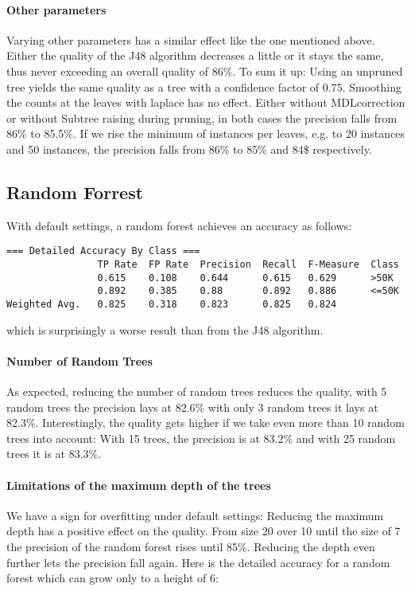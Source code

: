\documentclass[paper=a4, fontsize=11pt]{scrartcl} %
\numberwithin{equation}{section} %
\numberwithin{figure}{section} %
\numberwithin{table}{section} %
\begin{document}
\paragraph{Other parameters}
Varying other parameters has a similar effect like the one mentioned above. Either the quality of the J48 algorithm decreases a little or it stays the same, thus never exceeding an overall quality of 86\%. To sum it up: Using an unpruned tree yields the same quality as a tree with a confidence factor of 0.75. Smoothing the counts at the leaves with laplace has no effect. Either without MDLcorrection or without Subtree raising during pruning, in both cases the precision falls from 86\% to 85.5\%. If we rise the minimum of instances per leaves, e.g. to 20 instances and 50 instances, the precision falls from 86\% to 85\% and 84\$ respectively.

\subsection{Random Forrest}

With default settings, a random forest achieves an accuracy as follows:
\begin{lstlisting}
=== Detailed Accuracy By Class ===
                TP Rate  FP Rate  Precision  Recall  F-Measure  Class
                0.615    0.108    0.644      0.615   0.629      >50K
                0.892    0.385    0.88       0.892   0.886      <=50K
Weighted Avg.   0.825    0.318    0.823      0.825   0.824     
\end{lstlisting}
which is surprisingly a worse result than from the J48 algorithm. 

\paragraph{Number of Random Trees}
As expected, reducing the number of random trees reduces the quality, with 5 random trees the precision lays at 82.6\% with only 3 random trees it lays at 82.3\%. Interestingly, the quality gets higher if we take even more than 10 random trees into account: With 15 trees, the precision is at 83.2\% and with 25 random trees it is at 83.3\%.

\paragraph{Limitations of the maximum depth of the trees}
We have a sign for overfitting under default settings: Reducing the maximum depth has a positive effect on the quality. From size 20 over 10 until the size of 7 the precision of the random forest rises until 85\%. Reducing the depth even further lets the precision fall again. Here is the detailed accuracy for a random forest which can grow only to a height of 6:
\end{document}
